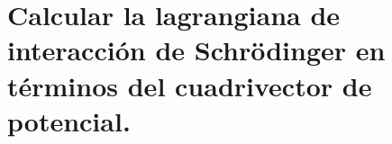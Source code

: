 \section{Calcular la lagrangiana de interacción de Schrödinger en términos del cuadrivector de potencial.}